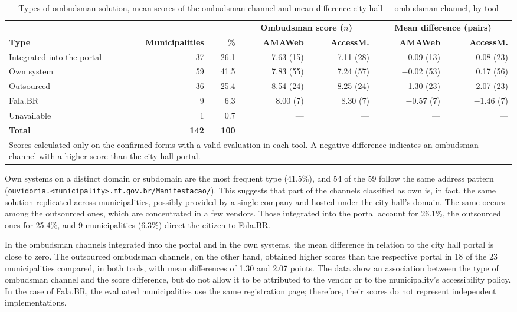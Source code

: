 \documentclass[12pt]{article}
\begin{document}
\begin{table}[ht]
\centering
\caption{Types of ombudsman solution, mean scores of the ombudsman channel and mean difference city hall $-$ ombudsman channel, by tool}
\label{tab:tipos}
\footnotesize
\setlength{\tabcolsep}{3pt}
\begin{tabular}{lrrrrrr}
\toprule
 & & & \multicolumn{2}{c}{\textbf{Ombudsman score ($n$)}} & \multicolumn{2}{c}{\textbf{Mean difference (pairs)}} \\
\cmidrule(lr){4-5}\cmidrule(lr){6-7}
\textbf{Type} & \textbf{Municipalities} & \textbf{\%} & \textbf{AMAWeb} & \textbf{AccessM.} & \textbf{AMAWeb} & \textbf{AccessM.} \\
\midrule
Integrated into the portal & 37 & 26.1 & 7.63 (15) & 7.11 (28) & $-$0.09 (13) &    0.08 (23) \\
Own system           & 59 & 41.5 & 7.83 (55) & 7.24 (57) & $-$0.02 (53) &    0.17 (56) \\
Outsourced           & 36 & 25.4 & 8.54 (24) & 8.25 (24) & $-$1.30 (23) & $-$2.07 (23) \\
Fala.BR              &  9 &  6.3 & 8.00 (7)  & 8.30 (7)  & $-$0.57 (7)  & $-$1.46 (7) \\
Unavailable          &  1 &  0.7 &  ---      &  ---      &     ---      &     --- \\
\midrule
\textbf{Total}       & \textbf{142} & \textbf{100} & & & & \\
\bottomrule
\multicolumn{7}{p{0.95\linewidth}}{\footnotesize Scores calculated only on the confirmed forms with a valid evaluation in each tool. A negative difference indicates an ombudsman channel with a higher score than the city hall portal.}
\end{tabular}
\end{table}

Own systems on a distinct domain or subdomain are the most frequent type (41.5\%), and 54 of the 59 follow the same address pattern (\texttt{ouvidoria.<municipality>.mt.gov.br/Manifestacao/}). This suggests that part of the channels classified as own is, in fact, the same solution replicated across municipalities, possibly provided by a single company and hosted under the city hall's domain. The same occurs among the outsourced ones, which are concentrated in a few vendors. Those integrated into the portal account for 26.1\%, the outsourced ones for 25.4\%, and 9 municipalities (6.3\%) direct the citizen to Fala.BR.

In the ombudsman channels integrated into the portal and in the own systems, the mean difference in relation to the city hall portal is close to zero. The outsourced ombudsman channels, on the other hand, obtained higher scores than the respective portal in 18 of the 23 municipalities compared, in both tools, with mean differences of 1.30 and 2.07 points. The data show an association between the type of ombudsman channel and the score difference, but do not allow it to be attributed to the vendor or to the municipality's accessibility policy. In the case of Fala.BR, the evaluated municipalities use the same registration page; therefore, their scores do not represent independent implementations.
\end{document}
